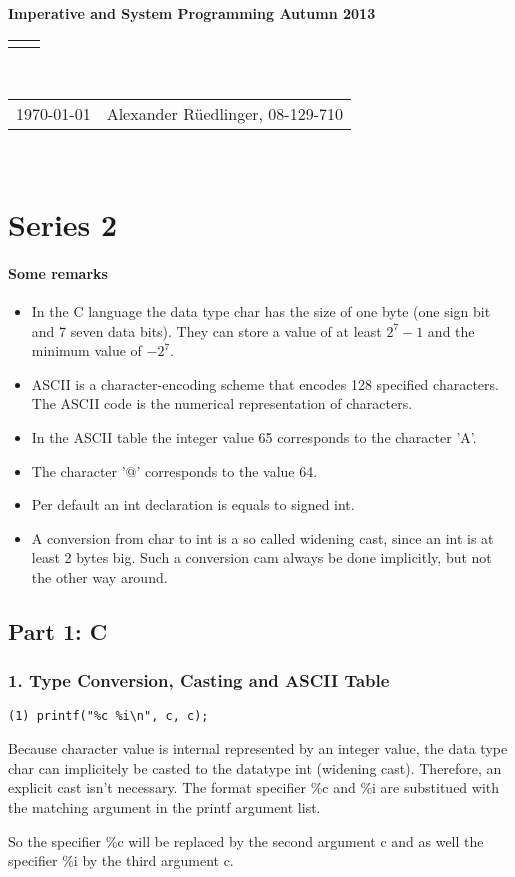 \documentclass[12pt]{article}
\renewcommand{\title}[1]{\textbf{#1}\\}
\renewcommand{\line}{\begin{tabularx}{\textwidth}{X>{\raggedleft}X}\hline\\\end{tabularx}\\[-0.5cm]}
\newcommand{\leftright}[2]{\begin{tabularx}{\textwidth}{X>{\raggedleft}X}#1%
& #2\\\end{tabularx}\\[-0.5cm]}
\begin{document}
\title{Imperative and System Programming Autumn 2013}
\line
\leftright{\today}{Alexander Rüedlinger, 08-129-710} %
\section*{Series 2}
\paragraph{Some remarks}
\begin{itemize}
\item In the C language the data type char has the size of one byte (one sign bit and 7 seven data bits). They can store a value of at least $2^7-1$ and the minimum value of $-2^7$.
\item ASCII is a character-encoding scheme that encodes 128 specified characters. The ASCII code is the numerical representation of characters.
\item In the ASCII table the integer value 65 corresponds to the character 'A'.
\item The character '@' corresponds to the value 64.
\item Per default an int declaration is equals to signed int.
\item A conversion from char to int is  a so called widening cast, since an int is at least 2 bytes big. Such a conversion cam always be done implicitly, but not the other way around.
\end{itemize}

\subsection*{Part 1: C}
\subsubsection*{1. Type Conversion, Casting and ASCII Table}
\begin{lstlisting}
(1) printf("%c %i\n", c, c);
\end{lstlisting}

Because character value is internal represented by an integer value, the data type char can implicitely be casted to the datatype int (widening cast). Therefore, an explicit cast isn't necessary. The format specifier \%c and \%i are substitued with the matching argument in the printf argument list. 

So the specifier \%c will be replaced by the second argument c and as well the specifier \%i by the third argument c.
\end{document}
